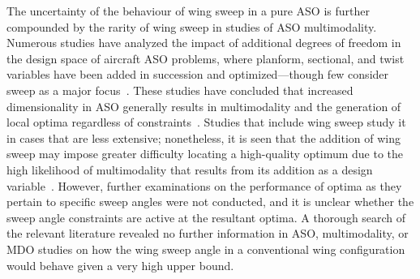 The uncertainty of the behaviour of wing sweep in a pure ASO is further compounded by the rarity of wing sweep in studies of ASO multimodality. Numerous studies have analyzed the impact of additional degrees of freedom in the design space of aircraft ASO problems, where planform, sectional, and twist variables have been added in succession and optimized—though few consider sweep as a major focus~\cite{lyu_rans-based_2014,  osusky_drag_2015, chernukhin_multimodality_2013, streuber_investigation_2017, koo_investigation_2018, poole_global_2018, poole_identifying_2018, streuber_evaluating_2021}. These studies have concluded that increased dimensionality in ASO generally results in multimodality and the generation of local optima regardless of constraints~\cite{lyu_rans-based_2014,  osusky_drag_2015, chernukhin_multimodality_2013, streuber_investigation_2017, koo_investigation_2018, poole_global_2018, poole_identifying_2018, streuber_evaluating_2021}. Studies that include wing sweep study it in cases that are less extensive; nonetheless, it is seen that the addition of wing sweep may impose greater difficulty locating a high-quality optimum due to the high likelihood of multimodality that results from its addition as a design variable~\cite{streuber_investigation_2017, poole_global_2018, poole_identifying_2018, streuber_evaluating_2021}. However, further examinations on the performance of optima as they pertain to specific sweep angles were not conducted, and it is unclear whether the sweep angle constraints are active at the resultant optima. A thorough search of the relevant literature revealed no further information in ASO, multimodality, or MDO studies on how the wing sweep angle in a conventional wing configuration would behave given a very high upper bound.

